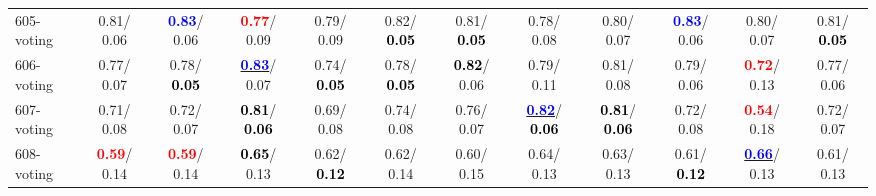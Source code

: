 \begin{table}[h]
\begin{center}
{\begin{tabular}{lc|c|c|c|c|c|c|c|c|c|c}
605-voting &   0.81/  0.06 & \textcolor{blue}{\textbf{  0.83}}/  0.06 & \textcolor{red}{\textbf{  0.77}}/  0.09 &   0.79/  0.09 &   0.82/\textcolor{black}{\textbf{  0.05}} &   0.81/\textcolor{black}{\textbf{  0.05}} &   0.78/  0.08 &   0.80/  0.07 & \textcolor{blue}{\textbf{  0.83}}/  0.06 &   0.80/  0.07 &   0.81/\textcolor{black}{\textbf{  0.05}} \\
606-voting &   0.77/  0.07 &   0.78/\textcolor{black}{\textbf{  0.05}} & \underline{\textcolor{blue}{\textbf{  0.83}}}/  0.07 &   0.74/\textcolor{black}{\textbf{  0.05}} &   0.78/\textcolor{black}{\textbf{  0.05}} & \textcolor{black}{\textbf{  0.82}}/  0.06 &   0.79/  0.11 &   0.81/  0.08 &   0.79/  0.06 & \textcolor{red}{\textbf{  0.72}}/  0.13 &   0.77/  0.06 \\
607-voting &   0.71/  0.08 &   0.72/  0.07 & \textcolor{black}{\textbf{  0.81}}/\textcolor{black}{\textbf{  0.06}} &   0.69/  0.08 &   0.74/  0.08 &   0.76/  0.07 & \underline{\textcolor{blue}{\textbf{  0.82}}}/\textcolor{black}{\textbf{  0.06}} & \textcolor{black}{\textbf{  0.81}}/\textcolor{black}{\textbf{  0.06}} &   0.72/  0.08 & \textcolor{red}{\textbf{  0.54}}/  0.18 &   0.72/  0.07 \\
608-voting & \textcolor{red}{\textbf{  0.59}}/  0.14 & \textcolor{red}{\textbf{  0.59}}/  0.14 & \textcolor{black}{\textbf{  0.65}}/  0.13 &   0.62/\textcolor{black}{\textbf{  0.12}} &   0.62/  0.14 &   0.60/  0.15 &   0.64/  0.13 &   0.63/  0.13 &   0.61/\textcolor{black}{\textbf{  0.12}} & \underline{\textcolor{blue}{\textbf{  0.66}}}/  0.13 &   0.61/  0.13 \\\end{tabular}}\label{stratsALCKappa18AllReduxa}
\end{center}
\end{table}
